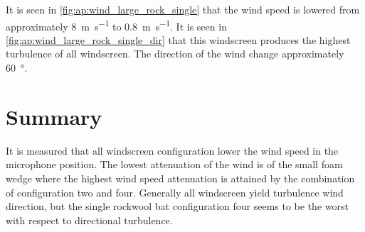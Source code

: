 It is seen in \autoref{fig:ap:wind_large_rock_single} that the wind speed is lowered from approximately \SI{8}{\meter\per\second} to \SI{0.8}{\meter\per\second}.  It is seen in \autoref{fig:ap:wind_large_rock_single_dir} that this windscreen produces the highest turbulence of all windscreen. The direction of the wind change approximately \SI{60}{\degree}.



\section*{Summary}
It is measured that all windscreen configuration lower the wind speed in the microphone position. The lowest attenuation of the wind is of the small foam wedge where the highest wind speed attenuation is attained by the combination of configuration two and four. Generally all windscreen yield turbulence wind direction, but the single rockwool bat configuration four seems to be the worst with respect to directional turbulence.




